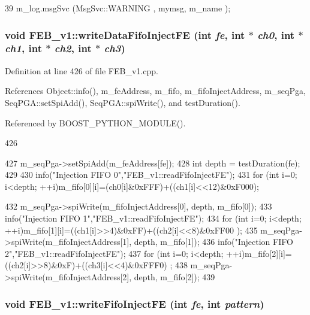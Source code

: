 \begin{DoxyCode}
39 { m_log.msgSvc (MsgSvc::WARNING , mymsg, m_name ); }
\end{DoxyCode}
\hypertarget{classFEB__v1_a0afafcfdea15d3268284203a90c67572}{
\subsubsection[{writeDataFifoInjectFE}]{\setlength{\rightskip}{0pt plus 5cm}void FEB\_\-v1::writeDataFifoInjectFE (int {\em fe}, \/  int $\ast$ {\em ch0}, \/  int $\ast$ {\em ch1}, \/  int $\ast$ {\em ch2}, \/  int $\ast$ {\em ch3})}}
\label{classFEB__v1_a0afafcfdea15d3268284203a90c67572}


Definition at line 426 of file FEB\_\-v1.cpp.

References Object::info(), m\_\-feAddress, m\_\-fifo, m\_\-fifoInjectAddress, m\_\-seqPga, SeqPGA::setSpiAdd(), SeqPGA::spiWrite(), and testDuration().

Referenced by BOOST\_\-PYTHON\_\-MODULE().


\begin{DoxyCode}
426                                                                                  
      {
427   m_seqPga->setSpiAdd(m_feAddress[fe]);
428   int depth = testDuration(fe);
429   
430   info("Injection FIFO 0","FEB_v1::readFifoInjectFE");        
431   for (int i=0; i<depth; ++i){m_fifo[0][i]=(ch0[i]&0xFFF)+((ch1[i]<<12)&0xF000);}
      
432   m_seqPga->spiWrite(m_fifoInjectAddress[0], depth, m_fifo[0]);
433   info("Injection FIFO 1","FEB_v1::readFifoInjectFE");        
434   for (int i=0; i<depth; ++i){m_fifo[1][i]=((ch1[i]>>4)&0xFF)+((ch2[i]<<8)&0xFF00
      );}
435   m_seqPga->spiWrite(m_fifoInjectAddress[1], depth, m_fifo[1]);
436   info("Injection FIFO 2","FEB_v1::readFifoInjectFE");        
437   for (int i=0; i<depth; ++i){m_fifo[2][i]=((ch2[i]>>8)&0xF)+((ch3[i]<<4)&0xFFF0)
      ;}
438   m_seqPga->spiWrite(m_fifoInjectAddress[2], depth, m_fifo[2]);
439 }
\end{DoxyCode}
\hypertarget{classFEB__v1_ae212b0e4c9824afaebb4508b688f94bf}{
\subsubsection[{writeFifoInjectFE}]{\setlength{\rightskip}{0pt plus 5cm}void FEB\_\-v1::writeFifoInjectFE (int {\em fe}, \/  int {\em pattern})}}
\label{classFEB__v1_ae212b0e4c9824afaebb4508b688f94bf}


